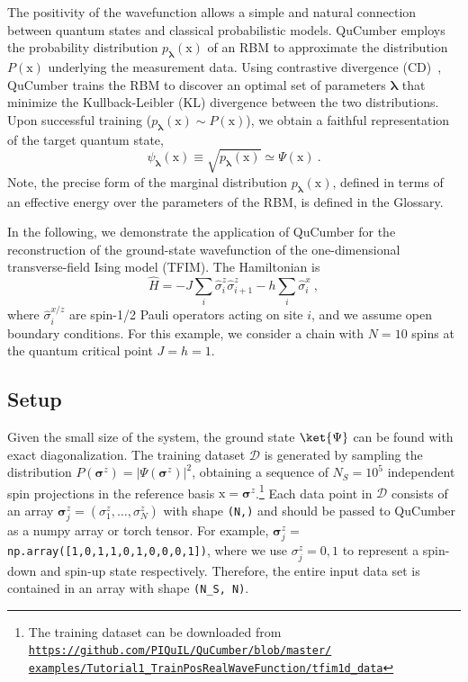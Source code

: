 \documentclass[submission, Phys, hidelnks]{SciPost}
\newcommand{\x}{\bm{\mathrm{x}}}
\begin{document}
The positivity of the wavefunction allows a simple and natural connection
between quantum states and classical probabilistic models. QuCumber employs the
probability distribution $p_{\bm{\lambda}}(\x)$ of an RBM to approximate the
distribution $P(\x)$ underlying the measurement data. Using contrastive
divergence (CD)~\cite{hinton_training_2002}, QuCumber trains the RBM to discover
an optimal set of parameters ${\bm \lambda}$ that minimize the Kullback-Leibler (KL) divergence
between the two distributions. Upon successful training
($p_{\bm{\lambda}}(\x)\sim P(\x)$), we obtain a faithful representation of
the target quantum state,
\begin{equation}\label{wfpd}
    \psi_{\bm{\lambda}}(\x) \equiv \sqrt{p_{\bm{\lambda}}(\x)}
    \simeq\Psi(\x)\:.
\end{equation}
Note, the precise form of the marginal distribution $p_{\bm{\lambda}}(\x)$, defined in terms of an effective energy
over the parameters of the RBM, is defined in the Glossary.

In the following, we demonstrate the application of QuCumber for the reconstruction of the
ground-state wavefunction of the one-dimensional transverse-field Ising model
(TFIM). The Hamiltonian is
\begin{equation}
    \hat{H} = -J\sum_i \hat{\sigma}^z_i \hat{\sigma}^z_{i+1} - h \sum_i\hat{\sigma}^x_i\:, \label{TFIM}
\end{equation}
where $\hat{\sigma}^{x/z}_i$ are spin-1/2 Pauli operators acting on site $i$,
and we assume open boundary conditions. For this example, we consider a chain
with $N=10$ spins at the quantum critical point $J=h=1$.

\subsection{Setup}\label{subsec:example}
Given the small size of the system, the ground state $\ket{ \Psi}$ can be found
with exact diagonalization. The training dataset $\mathcal{D}$ is generated by
sampling the distribution $P(\bm{\sigma}^z)=|\Psi(\bm{\sigma}^z)|^2$, obtaining
a sequence of $N_S=10^5$ independent spin projections in the reference basis
$\x = \bm{\sigma}^z$.\footnote{
        The training dataset can be downloaded from
        \href{https://github.com/PIQuIL/QuCumber/blob/master/examples/Tutorial1_TrainPosRealWaveFunction/tfim1d_data.txt}{\texttt{https://github.com/PIQuIL/QuCumber/blob/master/\\examples/Tutorial1\_TrainPosRealWaveFunction/tfim1d\_data}}
    }
Each data point in $\mathcal{D}$ consists of an array $\bm{\sigma}^z_j=(\sigma^z_1,\dots,\sigma^z_N)$ with shape \verb|(N,)| and should be passed to QuCumber as a numpy array or torch tensor. For example, $\bm{\sigma}^z_j=$ \verb|np.array([1,0,1,1,0,1,0,0,0,1])|, where we use $\sigma_j^z=0,1$ to represent a spin-down and spin-up state respectively. Therefore, the entire input data set is contained in an array with shape \verb|(N_S, N)|.
\end{document}
